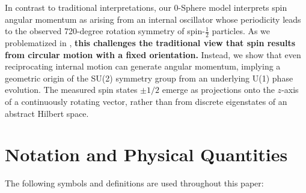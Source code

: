 \documentclass[%
 reprint,
 amsmath,amssymb,
 aps,
]{revtex4-1}
\numberwithin{equation}{section}%
\begin{document}
In contrast to traditional interpretations, our 0-Sphere model interprets spin angular momentum as arising from an internal oscillator whose periodicity leads to the observed 720-degree rotation symmetry of spin-$\frac{1}{2}$ particles. As we problematized in \cite{hanamura2309.0047}, \textbf{this challenges the traditional view that spin results from circular motion with a fixed orientation.} Instead, we show that even reciprocating internal motion can generate angular momentum, implying a geometric origin of the SU(2) symmetry group from an underlying U(1) phase evolution. The measured spin states $\pm 1/2$ emerge as projections onto the $z$-axis of a continuously rotating vector, rather than from discrete eigenstates of an abstract Hilbert space.

\section{Notation and Physical Quantities}
\label{sec:notation}

The following symbols and definitions are used throughout this paper:
\end{document}
